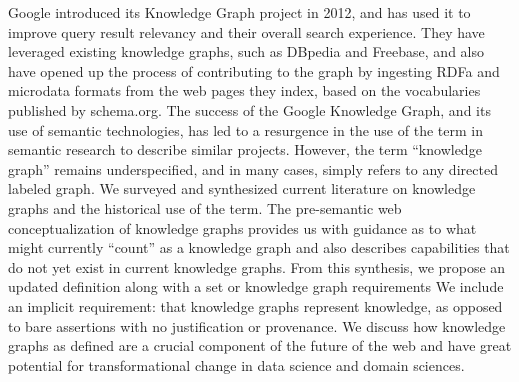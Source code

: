 Google introduced its Knowledge Graph project in 2012, and has used it to improve query result relevancy and their overall search experience.
They have leveraged existing knowledge graphs, such as DBpedia and Freebase, and also have opened up the process of contributing to the graph by ingesting RDFa and microdata formats from the web pages they index, based on the vocabularies published by schema.org.
The success of the Google Knowledge Graph, and its use of semantic technologies, has led to a resurgence in the use of the term in semantic research to describe similar projects.
However, the term ``knowledge graph'' remains underspecified, and in many cases, simply refers to any directed labeled graph.
We surveyed and synthesized current literature on knowledge graphs and the historical use of the term.  
The pre-semantic web conceptualization of knowledge graphs provides us with guidance as to what might currently ``count'' as a knowledge graph and also describes capabilities that do not yet exist in current knowledge graphs.
From this synthesis, we propose an updated definition along with a set or knowledge graph requirements  We include an implicit requirement: that knowledge graphs represent knowledge, as opposed to bare assertions with no justification or provenance.
We discuss how knowledge graphs as defined are a crucial component of the future of the web and have great potential for transformational change in data science and domain sciences.
